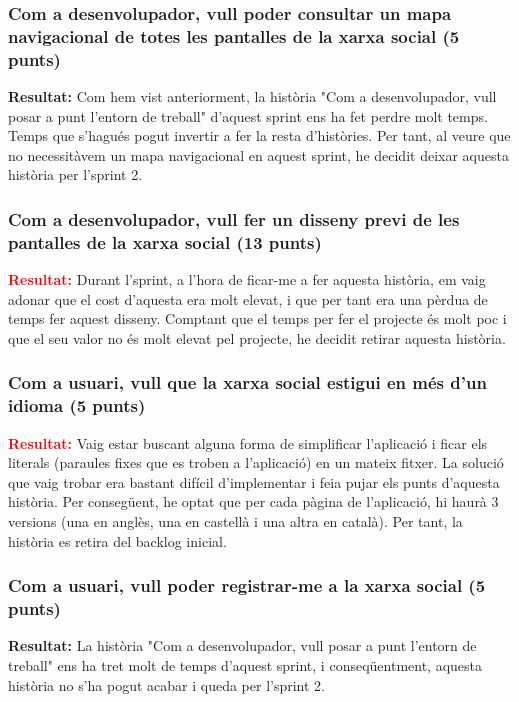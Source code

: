 \documentclass[11pt,catalan,listoffigures,listoftables]{tfgetsinf}
\begin{document}
\subsubsection{Com a desenvolupador, vull poder consultar un mapa navigacional de totes les pantalles de la xarxa social (5 punts)}

\textcolor{costumyellow}{\textbf{Resultat:}} Com hem vist anteriorment, la història "Com a desenvolupador, vull posar a punt l'entorn de treball" d'aquest sprint ens ha fet perdre molt temps. Temps que s'hagués pogut invertir a fer la resta d'històries. Per tant, al veure que no necessitàvem un mapa navigacional en aquest sprint, he decidit deixar aquesta història per l'sprint 2.

\subsubsection{Com a desenvolupador, vull fer un disseny previ de les pantalles de la xarxa social (13 punts)}

\textcolor{red}{\textbf{Resultat:}} Durant l'sprint, a l'hora de ficar-me a fer aquesta història, em vaig adonar que el cost d'aquesta era molt elevat, i que per tant era una pèrdua de temps fer aquest disseny. Comptant que el temps per fer el projecte és molt poc i que el seu valor no és molt elevat pel projecte, he decidit retirar aquesta història.

\subsubsection{Com a usuari, vull que la xarxa social estigui en més d'un idioma (5 punts)}

\textcolor{red}{\textbf{Resultat:}} Vaig estar buscant alguna forma de simplificar l'aplicació i ficar els literals (paraules fixes que es troben a l'aplicació) en un mateix fitxer. La solució que vaig trobar era bastant difícil d'implementar i feia pujar els punts d'aquesta història. Per consegüent, he optat que per cada pàgina de l'aplicació, hi haurà 3 versions (una en anglès, una en castellà i una altra en català). Per tant, la història es retira del backlog inicial.

\subsubsection{Com a usuari, vull poder registrar-me a la xarxa social (5 punts)}

\textcolor{costumyellow}{\textbf{Resultat:}} La història "Com a desenvolupador, vull posar a punt l'entorn de treball" ens ha tret molt de temps d'aquest sprint, i conseqüentment, aquesta història no s'ha pogut acabar i queda per l'sprint 2.
\end{document}
